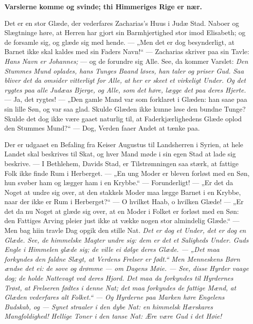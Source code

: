 \documentclass[12pt,a4paper]{book}
\begin{document}
\textbf{Varslerne komme og svinde; thi Himmeriges Rige er nær.}

Det er en stor Glæde, der vederfares Zacharias's Huus i Judæ Stad. Naboer og
Slægtninge høre, at Herren har gjort sin Barmhjertighed stor imod Elisabeth; og
de forsamle sig, og glæde sig med hende. --- „Men det er dog besynderligt, at
Barnet ikke skal kaldes med sin Faders Navn!“ --- Zacharias skriver paa sin
Tavle: \emph{Hans Navn er Johannes;} --- og de forundre sig Alle. See, da
kommer Varslet: \emph{Den Stummes Mund oplades, hans Tunges Baand løses, han
taler og priser Gud. Saa bliver det da omsider vitterligt for Alle, at her er
skeet et virkeligt Under. Og det rygtes paa alle Judæas Bjerge, og Alle, som det
høre, lægge det paa deres Hjerte.} --- Ja, det rygtes! --- „Den gamle Mand var
som forklaret i Glæden: han saae paa sin lille Søn, og var saa glad. Skulde
Glæden ikke kunne løse den bundne Tunge? Skulde det dog ikke være gaaet naturlig
til, at Faderkjærlighedens Glæde oplod den Stummes Mund?“ --- Dog, Verden faaer
Andet at tænke paa.

Der er udgaaet en Befaling fra Keiser Augustus til Landsherren i Syrien, at hele
Landet skal beskrives til Skat, og hver Mand møde i sin egen Stad at lade sig
beskrive. --- I Bethlehem,
Davids Stad, er Tilstrømningen saa stærk, at fattige Folk ikke finde Rum i
Herberget. --- „En ung Moder er bleven forløst med en Søn, hun svøber ham og
lægger ham i en Krybbe.“ --- Forunderligt! --- „Er det da Noget at undre sig
over, at den stakkels Moder maa lægge Barnet i en Krybbe, naar der ikke er Rum i
Herberget?“ --- O hvilket Haab, o hvilken Glæde! --- „Er det da nu Noget at
glæde sig over, at en Moder i Folket er forløst med en Søn: den Fattiges Arving
pleier just ikke at vække nogen stor almindelig Glæde.“ --- Men bag hiin travle
Dag opgik den stille Nat. \emph{Det er dog et Under, det er dog en Glæde. See,
de himmelske Magter undre sig: dem er det et Saligheds Under. Guds Engle i
Himmelen glæde sig; de ville ei dølge deres Glæde. --- „Det maa forkyndes den
faldne Slægt, at Verdens Frelser er født.“ Men Menneskens Børn ændse det ei: de
sove og drømme --- om Dagens Møie. --- See, disse Hyrder vaage dog; de holde
Nattevagt ved deres Hjord. Det maa da forkyndes til Hyrdernes Trøst, at
Frelseren fødtes i denne Nat; det maa forkyndes de fattige Mænd, at Glæden
vederfares alt Folket.“
--- Og Hyrderne paa Marken høre Engelens Budskab, og --- Synet straaler i den
dybe Nat: en himmelsk Hærskares Mangfoldighed! Hellige Toner i den tanse Nat:
Ære være Gud i det Høie!}
\end{document}
